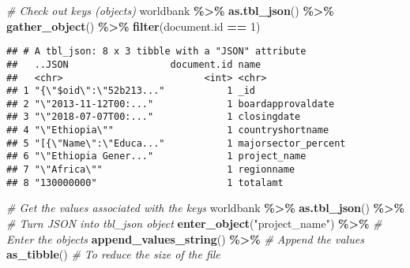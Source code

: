 \documentclass[
]{book}
\newenvironment{Shaded}{\begin{snugshade}}{\end{snugshade}}
\newcommand{\CommentTok}[1]{\textcolor[rgb]{0.56,0.35,0.01}{\textit{#1}}}
\newcommand{\DecValTok}[1]{\textcolor[rgb]{0.00,0.00,0.81}{#1}}
\newcommand{\KeywordTok}[1]{\textcolor[rgb]{0.13,0.29,0.53}{\textbf{#1}}}
\newcommand{\NormalTok}[1]{#1}
\newcommand{\OperatorTok}[1]{\textcolor[rgb]{0.81,0.36,0.00}{\textbf{#1}}}
\newcommand{\StringTok}[1]{\textcolor[rgb]{0.31,0.60,0.02}{#1}}
\begin{document}
\begin{Shaded}
\begin{Highlighting}[]
\CommentTok{\# Check out keys (objects)}
\NormalTok{worldbank }\OperatorTok{\%\textgreater{}\%}\StringTok{ }
\StringTok{  }\KeywordTok{as.tbl\_json}\NormalTok{() }\OperatorTok{\%\textgreater{}\%}
\StringTok{  }\KeywordTok{gather\_object}\NormalTok{() }\OperatorTok{\%\textgreater{}\%}
\StringTok{  }\KeywordTok{filter}\NormalTok{(document.id }\OperatorTok{==}\StringTok{ }\DecValTok{1}\NormalTok{)}
\end{Highlighting}
\end{Shaded}

\begin{verbatim}
## # A tbl_json: 8 x 3 tibble with a "JSON" attribute
##   ..JSON                  document.id name               
##   <chr>                         <int> <chr>              
## 1 "{\"$oid\":\"52b213..."           1 _id                
## 2 "\"2013-11-12T00:..."             1 boardapprovaldate  
## 3 "\"2018-07-07T00:..."             1 closingdate        
## 4 "\"Ethiopia\""                    1 countryshortname   
## 5 "[{\"Name\":\"Educa..."           1 majorsector_percent
## 6 "\"Ethiopia Gener..."             1 project_name       
## 7 "\"Africa\""                      1 regionname         
## 8 "130000000"                       1 totalamt
\end{verbatim}

\begin{Shaded}
\begin{Highlighting}[]
\CommentTok{\# Get the values associated with the keys }
\NormalTok{worldbank }\OperatorTok{\%\textgreater{}\%}\StringTok{ }
\StringTok{  }\KeywordTok{as.tbl\_json}\NormalTok{() }\OperatorTok{\%\textgreater{}\%}\StringTok{ }\CommentTok{\# Turn JSON into tbl\_json object }
\StringTok{  }\KeywordTok{enter\_object}\NormalTok{(}\StringTok{"project\_name"}\NormalTok{) }\OperatorTok{\%\textgreater{}\%}\StringTok{ }\CommentTok{\# Enter the objects }
\StringTok{  }\KeywordTok{append\_values\_string}\NormalTok{() }\OperatorTok{\%\textgreater{}\%}\StringTok{ }\CommentTok{\# Append the values }
\StringTok{  }\KeywordTok{as\_tibble}\NormalTok{() }\CommentTok{\# To reduce the size of the file }
\end{Highlighting}
\end{Shaded}
\end{document}
